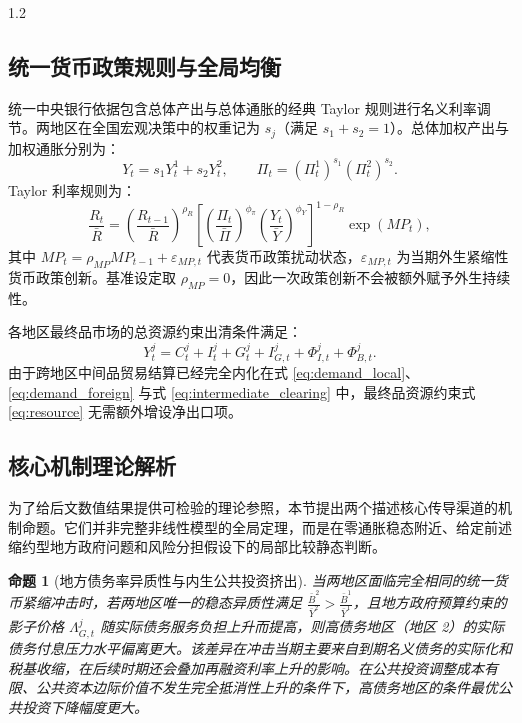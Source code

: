 \documentclass[12pt,UTF8]{ctexart}
\newtheorem{proposition}{命题}
\begin{document}
\begin{spacing}{1.2}
		\subsection{统一货币政策规则与全局均衡}
		
		统一中央银行依据包含总体产出与总体通胀的经典 Taylor 规则进行名义利率调节。两地区在全国宏观决策中的权重记为 $s_j$（满足 $s_1+s_2=1$）。总体加权产出与加权通胀分别为：
		\begin{equation}
			Y_t=s_1Y_t^1+s_2Y_t^2, \qquad \Pi_t=(\Pi_t^1)^{s_1}(\Pi_t^2)^{s_2}.
		\end{equation}
		Taylor 利率规则为：
		\begin{equation}
			\frac{R_t}{\bar R}
			=\left(\frac{R_{t-1}}{\bar R}\right)^{\rho_R}
			\left[
			\left(\frac{\Pi_t}{\bar\Pi}\right)^{\phi_\pi}
			\left(\frac{Y_t}{\bar Y}\right)^{\phi_Y}
			\right]^{1-\rho_R}
			\exp(MP_t),
			\label{eq:Taylor}
		\end{equation}
		其中 $MP_t = \rho_{MP}MP_{t-1} + \varepsilon_{MP,t}$ 代表货币政策扰动状态，$\varepsilon_{MP,t}$ 为当期外生紧缩性货币政策创新。基准设定取 $\rho_{MP}=0$，因此一次政策创新不会被额外赋予外生持续性。
		
		各地区最终品市场的总资源约束出清条件满足：
		\begin{equation}
			Y_t^j=C_t^j+I_t^j+G_t^j+I_{G,t}^j+\Phi_{I,t}^j+\Phi_{B,t}^j.
			\label{eq:resource}
		\end{equation}
		由于跨地区中间品贸易结算已经完全内化在式 \eqref{eq:demand_local}、\eqref{eq:demand_foreign} 与式 \eqref{eq:intermediate_clearing} 中，最终品资源约束式 \eqref{eq:resource} 无需额外增设净出口项。
		
		\subsection{核心机制理论解析}
		
		为了给后文数值结果提供可检验的理论参照，本节提出两个描述核心传导渠道的机制命题。它们并非完整非线性模型的全局定理，而是在零通胀稳态附近、给定前述缩约型地方政府问题和风险分担假设下的局部比较静态判断。
		
		
		\begin{proposition}[地方债务率异质性与内生公共投资挤出] \label{prop1}
			当两地区面临完全相同的统一货币紧缩冲击时，若两地区唯一的稳态异质性满足 $\frac{\bar B^2}{\bar Y^2} > \frac{\bar B^1}{\bar Y^1}$，且地方政府预算约束的影子价格 $\Lambda_{G,t}^j$ 随实际债务服务负担上升而提高，则高债务地区（地区 2）的实际债务付息压力水平偏离更大。该差异在冲击当期主要来自到期名义债务的实际化和税基收缩，在后续时期还会叠加再融资利率上升的影响。在公共投资调整成本有限、公共资本边际价值不发生完全抵消性上升的条件下，高债务地区的条件最优公共投资下降幅度更大。
		\end{proposition}
		

\end{spacing}
\end{document}
